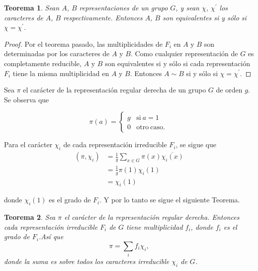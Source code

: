 \documentclass[12pt]{book}
\newtheorem{theorem}{Teorema}[section]
\theoremstyle{definition}
\newcounter{in}
\begin{document}
\begin{theorem}
  \label{t4_6}
  Sean $A$, $B$ representaciones de un grupo $G$, y sean $\chi$,
  $\chi^{'}$ los caracteres de $A$, $B$ respectivamente. Entonces $A$,
  $B$ son equivalentes si y sólo si $\chi=\chi^{'}$.
\end{theorem}

\begin{proof}
  Por el teorema pasado, las multiplicidades de $F_{i}$ en $A$ y $B$
  son determinadas por los caracteres de $A$ y $B$. Como cualquier
  representación de $G$ es completamente reducible, $A$ y $B$ son
  equivalentes si y sólo si cada representación $F_{i}$ tiene la misma
  multiplicidad en $A$ y $B$. Entonces $A \sim B$ si y sólo si $\chi=\chi^{'}$.
\end{proof}

Sea $\pi$ el carácter de la representación regular derecha de un grupo
$G$ de orden $g$. Se observa que

\begin{equation}
  \label{eq:39}
   \pi(a) = \left\{
     \begin{array}{ll}
       g      & \mathrm{si\ } a = 1 \\
       0      & \mathrm{otro\ caso.\ } 
     \end{array}
   \right.
\end{equation}

Para el carácter $\chi_{i}$ de cada representación irreducible
$F_{i}$, se sigue que
\begin{equation}
  \label{eq:40}
  \begin{aligned}
    (\pi,\chi_{i}) & =\frac{1}{g} \sum_{x \in G} \pi(x) \overline{\chi_{i}(x)} \\
    &=\frac{1}{g} \pi(1) \chi_{i}(1) \\
    &=\chi_{i}(1) 
  \end{aligned}
\end{equation}

donde $\chi_{i}(1)$ es el grado de $F_{i}$. Y por lo tanto se sigue el
siguiente Teorema.
\begin{theorem}
  \label{t4_7}
  Sea $\pi$ el carácter de la representación regular derecha. Entonces
  cada representación irreducible $F_{i}$ de $G$ tiene multiplicidad
  $f_{i}$, donde $f_{i}$ es el grado de $F_{i}$.Así que
  \begin{equation*}
    \pi=\sum_{i} f_{i} \chi_{i},
  \end{equation*}
  donde la suma es sobre todos los caracteres irreducible $\chi_{i}$ de $G$.
\end{theorem}
\end{document}
